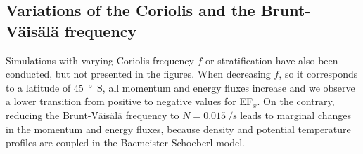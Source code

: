 \subsection*{Variations of the Coriolis and the Brunt-Väisälä frequency}
Simulations with varying Coriolis frequency $f$ or stratification have also been conducted, but not presented in the figures. When decreasing $f$, so it corresponds to a latitude of \SI{45}{\degree S}, all momentum and energy fluxes increase and we observe a lower transition from positive to negative values for EF$_x$. On the contrary, reducing the Brunt-Väisälä frequency to $N=\SI{0.015}{\per\second}$ leads to marginal changes in the momentum and energy fluxes, because density and potential temperature profiles are coupled in the Bacmeister-Schoeberl model.









